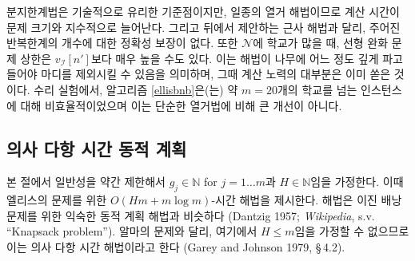 \documentclass[11pt]{article} %
\newif\ifen
\theoremstyle{definition}
\theoremstyle{definition}
\begin{document}
\ifen
The branch-and-bound algorithm is an interesting benchmark, but as a kind of enumeration algorithm, its computation time grows rapidly in the problem size, and unlike the approximation scheme we propose later on, there is no guaranteed bound on the approximation error after a fixed number of iterations. Moreover, when there are many schools in $\mathcal{N}$, the LP upper bound may be much higher than $v_{\mathcal{I}}[n']$. This means that significant fathoming operations do not occur until the algorithm has explored deep into the tree, at which point the bulk of the computational effort has already been exhausted. In our numerical experiments, Algorithm \ref{ellisbnb} was ineffective on instances larger than about $m=20$ schools, and therefore it does not represent a significant improvement over na\"ive enumeration. 
\else
분지한계법은 기술적으로 유리한 기준점이지만, 일종의 열거 해법이므로 계산 시간이 문제 크기와 지수적으로 늘어난다. 그리고 뒤에서 제안하는 근사 해법과 달리, 주어진 반복한계의 개수에 대한 정확성 보장이 없다. 또한 $\mathcal{N}$에 학교가 많을 때, 선형 완화 문제 상한은 $v_{\mathcal{I}}[n']$보다 매우 높을 수도 있다. 이는 해법이 나무에 어느 정도 깊게 파고들어야 마디를 제외시킬 수 있음을 의미하며, 그때 계산 노력의 대부분은 이미 쏟은 것이다. 수리 실험에서, 알고리즘 \ref{ellisbnb}은(는) 약 $m=20$개의 학교를 넘는 인스턴스에 대해 비효율적이었으며 이는 단순한 열거법에 비해 큰 개선이 아니다.
\fi





\ifen \subsection{Pseudopolynomial-time dynamic program} \else\subsection{의사 다항 시간 동적 계획} \fi
\ifen
In this subsection, we assume, with a small loss of generality, that $g_j \in \mathbb{N}$ for $j = 1\dots m$ and $H \in\mathbb{N}$, and provide an algorithmic solution to Ellis's problem that runs in $O(Hm + m\log m)$-time. The algorithm resembles a familiar dynamic programming algorithm for the binary knapsack problem (Dantzig 1957; \emph{Wikipedia}, s.v. ``Knapsack problem''). Because we cannot assume that $H \leq m$ (as was the case in Alma's problem), this represents a pseudopolynomial-time solution (Garey and Johnson 1979, \S\,4.2).
\else
본 절에서 일반성을 약간 제한해서 $g_j \in \mathbb{N}$ for $j = 1\dots m$과 $H \in\mathbb{N}$임을 가정한다. 이때 엘리스의 문제를 위한 $O(Hm + m\log m)$-시간 해법을 제시한다. 해법은 이진 배낭 문제를 위한 익숙한 동적 계획 해법과 비슷하다 (Dantzig 1957; \emph{Wikipedia}, s.v. ``Knapsack problem''). 알마의 문제와 달리, 여기에서 $H \leq m$임을 가정할 수 없으므로 이는 의사 다항 시간 해법이라고 한다 (Garey and Johnson 1979, \S\,4.2).
\fi
\end{document}
